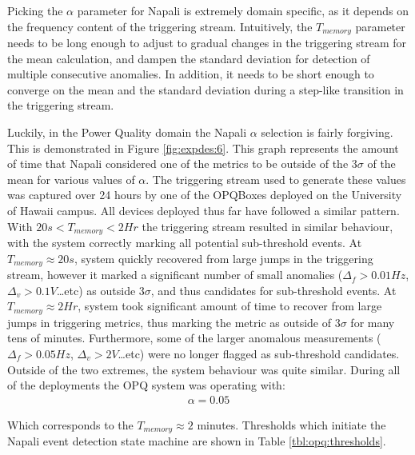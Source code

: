 Picking the $\alpha$ parameter for Napali is extremely domain specific, as it depends on the frequency content of the triggering stream.
Intuitively, the $T_{memory}$ parameter needs to be long enough to adjust to gradual changes in the triggering stream for the mean calculation,
and dampen the standard deviation for detection of multiple consecutive anomalies.
In addition, it needs to be short enough to converge on the mean and the standard deviation during a step-like transition in the triggering stream.

Luckily, in the Power Quality domain the Napali $\alpha$ selection is fairly forgiving.
This is demonstrated in Figure \ref{fig:expdes:6}.
This graph represents the amount of time that Napali considered one of the metrics to be outside of the $3\sigma$ of the mean for various values of $\alpha$.
The triggering stream used to generate these values was captured over 24 hours by one of the OPQBoxes deployed on the University of Hawaii campus.
All devices deployed thus far have followed a similar pattern.
With $20s <T_{memory} < 2Hr$ the triggering stream resulted in similar behaviour, with the system correctly marking all potential sub-threshold events.
At $T_{memory} \approx 20s$, system quickly recovered from large jumps in the triggering stream, however it marked a significant number of small anomalies ($\Delta_{f}>0.01Hz$, $\Delta_{v}> 0.1V$\ldots etc) as outside $3\sigma$, and thus candidates for sub-threshold events.
At $T_{memory} \approx 2Hr$, system took  significant amount of time to recover from large jumps in triggering metrics, thus marking the metric as outside of $3\sigma$ for many tens of minutes.
Furthermore, some of the larger anomalous measurements ($\Delta_{f}>0.05Hz$, $\Delta_{v}> 2V$\ldots etc) were no longer flagged as sub-threshold candidates.
Outside of the two extremes, the system behaviour was quite similar.
During all of the deployments the OPQ system was operating with:
\begin{equation}\label{eq:opq_alpha}
\begin{aligned}
    \alpha = 0.05
\end{aligned}
\end{equation}


Which corresponds to the $T_{memory} \approx 2$ minutes.
Thresholds which initiate the Napali event detection state machine are shown in Table \ref{tbl:opq:thresholds}.


